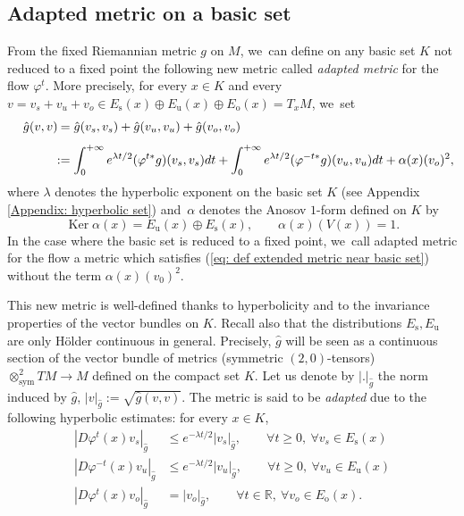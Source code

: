 \documentclass[JEP,XML,SOM,Unicode,NoEqCountersInSection,NoFloatCountersInSection,published]{cedram}
\newcommand{\ro}{\mathrm{o}}
\newcommand{\rs}{\mathrm{s}}
\newcommand{\ru}{\mathrm{u}}
\newcommand{\sym}{\mathrm{sym}}
\theoremstyle{definition}
\theoremstyle{plain}
\newcommand{\R}{\mathbb{R}}
\DeclareMathOperator{\Ker}{Ker}
\begin{document}
\subsection{Adapted metric on a basic set}\label{subsubsection adapted metric}

From the fixed Riemannian metric $g$ on $M$, we~can define on any basic set $K$ not reduced to a fixed point the following new metric called \emph{adapted metric} for the flow $\varphi^t$. More precisely, for every $x \in K$ and every $v = v_s + v_u + v_o \in E_\rs (x) \oplus E_\ru (x) \oplus E_\ro (x) = T_x M$, we~set
\begin{align}\label{eq: def extended metric near basic set}
\quad\hat{g} (v,v) \!\!&\hphantom{:}= \hat{g}(v_s, v_s) + \hat{g}(v_u, v_u) + \hat{g}(v_o, v_o) \notag\\[-1pt]\\[-10pt]\notag
&:= \int_0^{+\infty} e^{\lambda t /2} (\varphi^{t*} g) (v_s,v_s) dt + \int_0^{+\infty} e^{\lambda t /2} (\varphi^{-t*} g) (v_u,v_u) dt + \alpha(x) (v_o)^2,
\end{align}
where $\lambda$ denotes the hyperbolic exponent on the basic set $K$ (see Appendix \ref{Appendix: hyperbolic set}) and~$\alpha$ denotes the Anosov $1$-form defined on $K$ by
\[
\Ker \alpha (x) = E_\ru (x) \oplus E_\rs (x), \qquad \alpha (x) (V(x)) = 1.
\]
In the case where the basic set is reduced to a fixed point, we~call adapted metric for the flow a metric which satisfies (\ref{eq: def extended metric near basic set}) without the term $\alpha (x) (v_0)^2$.

This new metric is well-defined thanks to hyperbolicity and to the invariance properties of the vector bundles on $K$. Recall also that the distributions $E_\rs, E_\ru$ are only Hölder continuous in general. Precisely, $\hat{g}$ will be seen as a continuous section of the vector bundle of metrics (\ie symmetric $(2,0)$-tensors) $\otimes_{\sym}^2 T M \to M$ defined on the compact set $K$. Let us denote by $|.|_{\hat{g}}$ the norm induced by $\hat{g}$, \ie $|v|_{\hat{g}}:= \sqrt{\hat{g}(v,v)}$. The metric is said to be \textit{adapted} due to the following hyperbolic estimates: for every $x \in K$,
\begin{equation}\label{hyperbolic estimates for the adapted metric}
\begin{split}
|D\varphi^t (x) v_s |_{\hat{g}} &\leq e^{-\lambda t /2} |v_s |_{\hat{g}}, \qquad \forall t \geq 0, \: \forall v_s \in E_\rs (x) \\
|D\varphi^{-t} (x) v_u |_{\hat{g}} &\leq e^{-\lambda t /2} |v_u |_{\hat{g}}, \qquad \forall t \geq 0, \: \forall v_u \in E_\ru (x) \\
|D\varphi^t (x) v_o |_{\hat{g}} &= |v_o |_{\hat{g}}, \qquad \forall t \in \R, \:\forall v_o \in E_\ro (x).
\end{split}
\end{equation}
\end{document}
